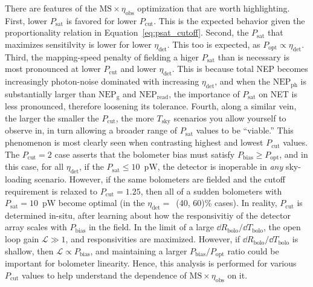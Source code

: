There are features of the $\mathrm{MS} \times \eta_{\mathrm{obs}}$ optimization that are worth highlighting. First, lower $P_{\mathrm{sat}}$ is favored for lower $P_{\mathrm{cut}}$. This is the expected behavior given the proportionality relation in Equation~\ref{eq:psat_cutoff}. Second, the $P_{\mathrm{sat}}$ that maximizes sensitilvity is lower for lower $\eta_{\mathrm{det}}$. This too is expected, as $P_{\mathrm{opt}} \propto \eta_{\mathrm{det}}$. Third, the mapping-speed penalty of fielding a higer $P_{\mathrm{sat}}$ than is necessary is most pronounced at lower $P_{\mathrm{cut}}$ and lower $\eta_{\mathrm{det}}$. This is because total NEP becomes increasingly photon-noise dominated with increasing $\eta_{\mathrm{det}}$, and when the $\mathrm{NEP_{ph}}$ is substantially larger than $\mathrm{NEP_{g}}$ and $\mathrm{NEP_{read}}$, the importance of $P_{\mathrm{sat}}$ on NET is less pronounced, therefore loosening its tolerance. Fourth, along a similar vein, the larger the smaller the $P_{\mathrm{cut}}$, the more $T_{\mathrm{sky}}$ scenarios you allow yourself to observe in, in turn allowing a broader range of $P_{\mathrm{sat}}$ values to be ``viable.'' This phenomenon is most clearly seen when contrasting highest and lowest $P_{\mathrm{cut}}$ values. The $P_{\mathrm{cut}} = 2$ case asserts that the bolometer bias must satisfy $P_{\mathrm{bias}} \geq P_{\mathrm{opt}}$, and in this case, for all $\eta_{\mathrm{det}}$, if the $P_{\mathrm{sat}} \leq 10$~pW, the detector is inoperable in \textit{any} sky-loading scenario. However, if the same bolometers are fielded and the cutoff requirement is relaxed to $P_{\mathrm{cut}} = 1.25$, then all of a sudden bolometers with $P_{\mathrm{sat}} = 10$~pW become optimal (in the $\eta_{\mathrm{det}} =$~(40, 60)\% cases). In reality, $P_{\mathrm{cut}}$ is determined in-situ, after learning about how the responsivitiy of the detector array scales with $P_{\mathrm{bias}}$ in the field. In the limit of a large $\dd R_{\mathrm{bolo}} / \dd T_{\mathrm{bolo}}$, the open loop gain $\mathcal{L} \gg 1$, and responsivities are maximized. However, if $\dd R_{\mathrm{bolo}} / \dd T_{\mathrm{bolo}}$ is shallow, then $\mathcal{L} \propto P_{\mathrm{bias}}$, and maintaining a larger $P_{\mathrm{bias}} / P_{\mathrm{opt}}$ ratio could be important for bolometer linearity. Hence, this analysis is performed for various $P_{\mathrm{cut}}$ values to help understand the dependence of $\mathrm{MS} \times \eta_{\mathrm{obs}}$ on it.

